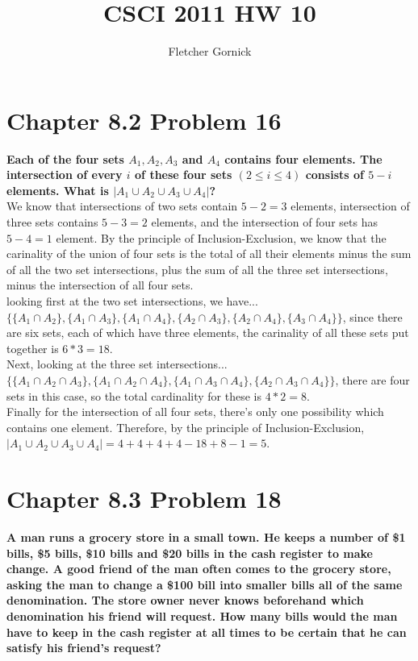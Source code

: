 \documentclass[10pt]{article}
\title{CSCI 2011 HW 10}
\author{Fletcher Gornick}
\begin{document}
\maketitle

\section{Chapter 8.2 Problem 16}
\textbf{Each of the four sets $A_1,A_2,A_3$ and $A_4$ contains four elements.  The intersection of every $i$ of these four
sets $(2 \leq i \leq 4)$ consists of $5 - i$ elements.  What is $|A_1 \cup A_2 \cup A_3 \cup A_4|$?} \\

We know that intersections of two sets contain $5 - 2 = 3$ elements, intersection of three sets contains $5 - 3 = 2$ elements, and
the intersection of four sets has $5 - 4 = 1$ element.  By the principle of Inclusion-Exclusion, we know that the carinality of the 
union of four sets is the total of all their elements minus the sum of all the two set intersections, plus the sum of all the three
set intersections, minus the intersection of all four sets. \\

looking first at the two set intersections, we have... \\
$\Big\{\{A_1 \cap A_2\}, \{A_1 \cap A_3\}, \{A_1 \cap A_4\}, \{A_2 \cap A_3\}, \{A_2 \cap A_4\}, \{A_3 \cap A_4\}\Big\}$, since there 
are six sets, each of which have three elements, the carinality of all these sets put together is $6 * 3 = 18$. \\

Next, looking at the three set intersections... \\
$\Big\{\{A_1 \cap A_2 \cap A_3\}, \{A_1 \cap A_2 \cap A_4\}, \{A_1 \cap A_3 \cap A_4\}, \{A_2 \cap A_3 \cap A_4\}\Big\}$, there are four
sets in this case, so the total cardinality for these is $4 * 2 = 8$. \\

Finally for the intersection of all four sets, there's only one possibility which contains one element.  Therefore, by the principle
of Inclusion-Exclusion, $|A_1 \cup A_2 \cup A_3 \cup A_4| = 4 + 4 + 4 + 4 - 18 + 8 - 1 = 5$.


\section{Chapter 8.3 Problem 18}
\textbf{A man runs a grocery store in a small town. He keeps a number of \$1 bills, \$5 bills, \$10 bills and \$20 bills in 
the cash register to make change. A good friend of the man often comes to the grocery store, asking the man to change a \$100 
bill into smaller bills all of the same denomination. The store owner never knows beforehand which denomination his friend 
will request. How many bills would the man have to keep in the cash register at all times to be certain that he can satisfy 
his friend’s request?} \\
\end{document}

